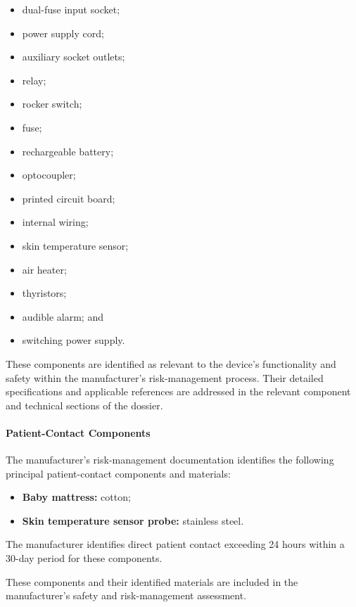 \begin{itemize}
    \item dual-fuse input socket;
    \item power supply cord;
    \item auxiliary socket outlets;
    \item relay;
    \item rocker switch;
    \item fuse;
    \item rechargeable battery;
    \item optocoupler;
    \item printed circuit board;
    \item internal wiring;
    \item skin temperature sensor;
    \item air heater;
    \item thyristors;
    \item audible alarm; and
    \item switching power supply.
\end{itemize}

These components are identified as relevant to the device's
functionality and safety within the manufacturer's risk-management
process. Their detailed specifications and applicable references
are addressed in the relevant component and technical sections of
the dossier.


\paragraph{Patient-Contact Components}

The manufacturer's risk-management documentation identifies the
following principal patient-contact components and materials:

\begin{itemize}
    \item \textbf{Baby mattress:} cotton;
    \item \textbf{Skin temperature sensor probe:} stainless steel.
\end{itemize}

The manufacturer identifies direct patient contact exceeding
24 hours within a 30-day period for these components.

These components and their identified materials are included in the
manufacturer's safety and risk-management assessment.

